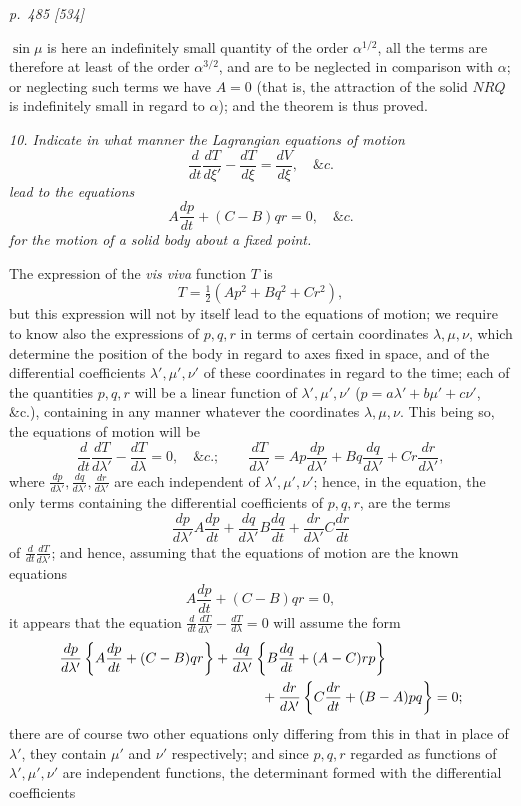 \documentclass[11pt,a4paper]{article}
\theoremstyle{plain}
\theoremstyle{definition}
\newcommand{\sect}[1]{\medskip\noindent\textit{#1}}
\newcommand{\half}{\tfrac12}
\begin{document}
\bigskip
\textit{p.~485 [534]}
\smallskip

\noindent
$\sin\mu$ is here an indefinitely small quantity of the order $\alpha^{1/2}$, all
the terms are therefore at least of the order $\alpha^{3/2}$, and are to be neglected
in comparison with $\alpha$; or neglecting such terms we have $A=0$ (that is, the
attraction of the solid $NRQ$ is indefinitely small in regard to $\alpha$); and the
theorem is thus proved.

\sect{10. Indicate in what manner the Lagrangian equations of motion}
\[
        \frac{d}{dt}\frac{dT}{d\xi'}-\frac{dT}{d\xi}=\frac{dV}{d\xi},\quad \&c.
\]
\sect{lead to the equations}
\[
        A\frac{dp}{dt}+(C-B)qr=0,\quad \&c.
\]
\sect{for the motion of a solid body about a fixed point.}

The expression of the \textit{vis viva} function $T$ is
\[
        T=\half(Ap^2+Bq^2+Cr^2),
\]
but this expression will not by itself lead to the equations of motion; we require
to know also the expressions of $p,q,r$ in terms of certain coordinates
$\lambda,\mu,\nu$, which determine the position of the body in regard to axes fixed
in space, and of the differential coefficients $\lambda',\mu',\nu'$ of these coordinates
in regard to the time; each of the quantities $p,q,r$ will be a linear function of
$\lambda',\mu',\nu'$ ($p=a\lambda'+b\mu'+c\nu'$, \&c.), containing in any manner
whatever the coordinates $\lambda,\mu,\nu$. This being so, the equations of motion
will be
\[
\frac{d}{dt}\frac{dT}{d\lambda'}-\frac{dT}{d\lambda}=0,\quad \&c.;\qquad
\frac{dT}{d\lambda'}=Ap\frac{dp}{d\lambda'}
+Bq\frac{dq}{d\lambda'}+Cr\frac{dr}{d\lambda'},
\]
where $\frac{dp}{d\lambda'},\frac{dq}{d\lambda'},\frac{dr}{d\lambda'}$ are each
independent of $\lambda',\mu',\nu'$; hence, in the equation, the only terms
containing the differential coefficients of $p,q,r$, are the terms
\[
\frac{dp}{d\lambda'}A\frac{dp}{dt}
+\frac{dq}{d\lambda'}B\frac{dq}{dt}
+\frac{dr}{d\lambda'}C\frac{dr}{dt}
\]
of $\frac{d}{dt}\frac{dT}{d\lambda'}$; and hence, assuming that the equations of
motion are the known equations
\[
        A\frac{dp}{dt}+(C-B)qr=0,
\]
it appears that the equation
$\frac{d}{dt}\frac{dT}{d\lambda'}-\frac{dT}{d\lambda}=0$ will assume the form
\[
\begin{split}
&\frac{dp}{d\lambda'}\left\{A\frac{dp}{dt}+(C-B)qr\right\}
+\frac{dq}{d\lambda'}\left\{B\frac{dq}{dt}+(A-C)rp\right\}\\
&\hspace{2.0in}
+\frac{dr}{d\lambda'}\left\{C\frac{dr}{dt}+(B-A)pq\right\}=0;
\end{split}
\]
there are of course two other equations only differing from this in that in place
of $\lambda'$, they contain $\mu'$ and $\nu'$ respectively; and since $p,q,r$
regarded as functions of $\lambda',\mu',\nu'$ are independent functions, the
determinant formed with the differential coefficients
\clearpage
\end{document}
